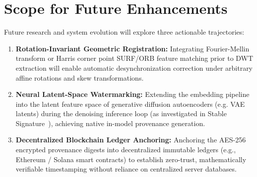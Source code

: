 \documentclass[12pt,a4paper]{report}
\begin{document}
\section{Scope for Future Enhancements}
Future research and system evolution will explore three actionable trajectories:
\begin{enumerate}
    \item \textbf{Rotation-Invariant Geometric Registration:} Integrating Fourier-Mellin transform or Harris corner point SURF/ORB feature matching prior to DWT extraction will enable automatic desynchronization correction under arbitrary affine rotations and skew transformations.
    \item \textbf{Neural Latent-Space Watermarking:} Extending the embedding pipeline into the latent feature space of generative diffusion autoencoders (e.g. VAE latents) during the denoising inference loop (as investigated in Stable Signature~\cite{fernandez2023stable}), achieving native in-model provenance generation.
    \item \textbf{Decentralized Blockchain Ledger Anchoring:} Anchoring the AES-256 encrypted provenance digests into decentralized immutable ledgers (e.g., Ethereum / Solana smart contracts) to establish zero-trust, mathematically verifiable timestamping without reliance on centralized server databases.
\end{enumerate}



\end{document}
